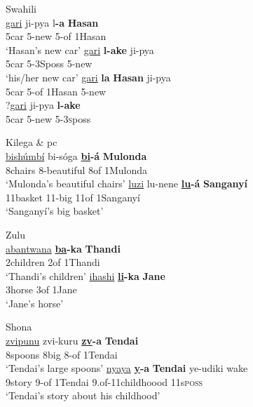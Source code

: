 \documentclass[output=paper
,modfonts
,nonflat]{langsci/langscibook}
\begin{document}
\begin{exe}
		\ex Swahili \citep[100]{Carstens1991}\\
		\xlist
		\ex 
		\gll \underline{gari}     ji-pya     l\textbf{-a}     \textbf{Hasan}\\
		5car   5-new     5-of    1Hasan\\
		\glt `Hasan's new car'  	
		\ex 
		\gll \underline{gari}     \textbf{l{}-ake}    ji-pya\\
		5car  5-3Sposs  5-new\\
		\glt `his/her new car'
		\ex
		\gll  *\underline{gari}  \textbf{la}     \textbf{Hasan}      ji-pya\\
		5car 5-of   1Hasan   5-new\\
		\ex
		\gll  ?\underline{gari}   ji-pya   \textbf{l{}-ake}\\
		5car   5-new   5-3\textsc{s}poss\\
		\endxlist
\end{exe}
\begin{exe}
	\ex Kilega \citep{Kinyalolo1991} \& pc\\
	\xlist
	\ex 
	\gll \underline{bishúmbí}   bi-sóga        \textbf{\underline{bi}-á}   \textbf{Mulonda} \\
	8chairs       8-beautiful     8of    1Mulonda\\
	\glt `Mulonda’s beautiful chairs'  	
	\ex 
	\gll \underline{luzi}               lu-nene   \textbf{\underline{lu}-á}    \textbf{Sanganyí}\\
	11basket   11-big    11of      1Sanganyí\\
	\glt `Sanganyí’s big basket'
	\endxlist
\end{exe}
\begin{exe}
	\ex Zulu\\
	\xlist
	\ex 
	\gll \underline{abantwana} \textbf{\underline{ba}{}-ka}   \textbf{Thandi} \\
	2children     2of        1Thandi\\
	\glt `Thandi’s children'  	
	\ex 
	\gll \underline{ihashi}   \textbf{\underline{li}{}-ka}  \textbf{Jane}\\
	3horse 3of     1Jane\\
	\glt `Jane’s horse'
	\endxlist
\end{exe}
\begin{exe}
	\ex Shona\\
	\xlist
	\ex 
	\gll \underline{zvipunu}   zvi-kuru \textbf{\underline{zv}{}-a}     \textbf{Tendai} \\
	8spoons   8big       8-of    1Tendai\\
	\glt `Tendai’s large spoons'  	
	\ex 
	\gll \underline{nyaya}   \textbf{\underline{y}{}-a}     \textbf{Tendai}   ye-udiki             wake\\
	9story   9-of    1Tendai   9.of-11childhoood     11s\textsc{poss}\\
	\glt `Tendai's story about his childhood'
	\endxlist
\end{exe}
\end{document}
